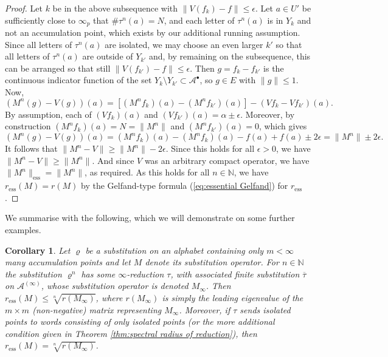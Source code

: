 \documentclass[11pt]{amsart}
\numberwithin{equation}{section}
\theoremstyle{plain}
\newtheorem{corollary}[theorem]{Corollary}
\theoremstyle{definition}
\newcommand{\N}{{\mathbb N}}
\newcommand{\mc}{\mathcal}
\newcommand{\A}{\mc A}
\newcommand{\sub}{\varrho}
\begin{document}
\begin{proof}
Let \(k\) be in the above subsequence with \(\|V(f_k) - f\| \leq \epsilon\). Let \(a \in U'\) be sufficiently close to \(\infty_p\) that \(\# \tau^n(a) = N\), and each letter of \(\tau^n(a)\) is in \(Y_k\) and not an accumulation point, which exists by our additional running assumption. Since all letters of \(\tau^n(a)\) are isolated, we may choose an even larger \(k'\) so that all letters of \(\tau^n(a)\) are outside of \(Y_{k'}\) and, by remaining on the subsequence, this can be arranged so that still \(\|V(f_{k'}) - f\| \leq \epsilon\). Then \(g = f_k - f_{k'}\) is the continuous indicator function of the set \(Y_k \setminus Y_{k'} \subset \A^\bullet\), so \(g \in E\) with \(\|g\| \leq 1\). Now,
\[
(M^n(g) - V(g))(a) = [(M^n f_k)(a) - (M^n f_{k'})(a)] - (V f_k - V f_{k'})(a) .
\]
By assumption, each of \((V f_k)(a)\) and \((V f_{k'})(a) = \alpha \pm \epsilon\). Moreover, by construction \((M^n f_k)(a) = N = \| M^n \|\) and \((M^n f_{k'})(a) = 0\), which gives
\[
(M^n(g) - V(g))(a) = (M^n f_k)(a) - (M^n f_k)(a) - f(a) + f(a) \pm 2\epsilon = \|M^n\| \pm 2\epsilon .
\]
It follows that \(\|M^n - V\| \geq \|M^n\| - 2\epsilon\). Since this holds for all \(\epsilon > 0\), we have \(\|M^n - V\| \geq \|M^n\|\). And since \(V\) was an arbitrary compact operator, we have \( \|M^n\|_\mathrm{ess} = \|M^n\|\), as required. As this holds for all \(n \in \N\), we have \(r_\mathrm{ess}(M) = r(M)\) by the Gelfand-type formula (\ref{eq:essential Gelfand}) for \(r_\mathrm{ess}\).
\end{proof}

We summarise with the following, which we will demonstrate on some further examples.

\begin{corollary}\label{cor:essential spectral radius}
Let \(\sub\) be a substitution on an alphabet containing only \(m < \infty\) many accumulation points and let \(M\) denote its substitution operator. For \(n \in \N\) the substitution \(\sub^n\) has some \(\infty\)-reduction \(\tau\), with associated finite substitution \(\overline{\tau}\) on \(\A^{(\infty)}\), whose substitution operator is denoted \(M_\infty\). Then \(r_\mathrm{ess}(M) \leq \sqrt[n]{r(M_\infty)}\), where \(r(M_\infty)\) is simply the leading eigenvalue of the \(m \times m\) (non-negative) matrix representing \(M_\infty\). Moreover, if \(\tau\) sends isolated points to words consisting of only isolated points (or the more additional condition given in Theorem \ref{thm:spectral radius of reduction}), then \(r_\mathrm{ess}(M) = \sqrt[n]{r(M_\infty)}\).
\end{corollary}
\end{document}
